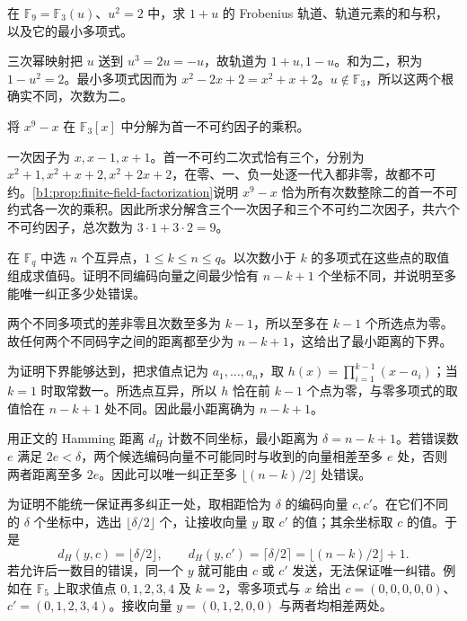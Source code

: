 \begin{exercise}\label{b1:ex:17-orbit-sum-product}
	在 \(\mathbb F_9=\mathbb F_3(u)\)、\(u^2=2\) 中，求 \(1+u\) 的 Frobenius 轨道、轨道元素的和与积，以及它的最小多项式。
\end{exercise}
\begin{solution}
	三次幂映射把 \(u\) 送到 \(u^3=2u=-u\)，故轨道为 \(1+u,1-u\)。和为二，积为 \(1-u^2=2\)。最小多项式因而为 \(x^2-2x+2=x^2+x+2\)。\(u\notin\mathbb F_3\)，所以这两个根确实不同，次数为二。
\end{solution}

\begin{exercise}\label{b1:ex:17-factor-nine}
	将 \(x^9-x\) 在 \(\mathbb F_3[x]\) 中分解为首一不可约因子的乘积。
\end{exercise}
\begin{solution}
	一次因子为 \(x,x-1,x+1\)。首一不可约二次式恰有三个，分别为 \(x^2+1,x^2+x+2,x^2+2x+2\)，在零、一、负一处逐一代入都非零，故都不可约。\cref{b1:prop:finite-field-factorization}说明 \(x^9-x\) 恰为所有次数整除二的首一不可约式各一次的乘积。因此所求分解含三个一次因子和三个不可约二次因子，共六个不可约因子，总次数为 \(3\cdot1+3\cdot2=9\)。
\end{solution}

\begin{exercise}\label{b1:ex:17-evaluation-distance}
	在 \(\mathbb F_q\) 中选 \(n\) 个互异点，\(1\leq k\leq n\leq q\)。以次数小于 \(k\) 的多项式在这些点的取值组成求值码。证明不同编码向量之间最少恰有 \(n-k+1\) 个坐标不同，并说明至多能唯一纠正多少处错误。
\end{exercise}
\begin{solution}
	两个不同多项式的差非零且次数至多为 \(k-1\)，所以至多在 \(k-1\) 个所选点为零。故任何两个不同码字之间的距离都至少为 \(n-k+1\)，这给出了最小距离的下界。

	为证明下界能够达到，把求值点记为 \(a_1,\ldots,a_n\)，取 \(h(x)=\prod_{i=1}^{k-1}(x-a_i)\)；当 \(k=1\) 时取常数一。所选点互异，所以 \(h\) 恰在前 \(k-1\) 个点为零，与零多项式的取值恰在 \(n-k+1\) 处不同。因此最小距离确为 \(n-k+1\)。

	用正文的 Hamming 距离 \(d_H\) 计数不同坐标，最小距离为 \(\delta=n-k+1\)。若错误数 \(e\) 满足 \(2e<\delta\)，两个候选编码向量不可能同时与收到的向量相差至多 \(e\) 处，否则两者距离至多 \(2e\)。因此可以唯一纠正至多 \(\lfloor(n-k)/2\rfloor\) 处错误。

	为证明不能统一保证再多纠正一处，取相距恰为 \(\delta\) 的编码向量 \(c,c'\)。在它们不同的 \(\delta\) 个坐标中，选出 \(\lfloor\delta/2\rfloor\) 个，让接收向量 \(y\) 取 \(c'\) 的值；其余坐标取 \(c\) 的值。于是
	\[
		d_H(y,c)=\lfloor\delta/2\rfloor,\qquad d_H(y,c')=\lceil\delta/2\rceil =\lfloor(n-k)/2\rfloor+1.
	\]
	若允许后一数目的错误，同一个 \(y\) 就可能由 \(c\) 或 \(c'\) 发送，无法保证唯一纠错。例如在 \(\mathbb F_5\) 上取求值点 \(0,1,2,3,4\) 及 \(k=2\)，零多项式与 \(x\) 给出 \(c=(0,0,0,0,0)\)、\(c'=(0,1,2,3,4)\)。接收向量 \(y=(0,1,2,0,0)\) 与两者均相差两处。
\end{solution}

